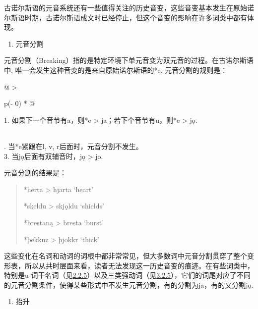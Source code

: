 古诺尔斯语的元音系统还有一些值得关注的历史音变，这些音变基本发生在原始诺尔斯语时期，古诺尔斯语成文时已经停止，但这个音变的影响在许多词类中都有体现。

\begin{enumerate}
  \def\labelenumi{\Alph{enumi}.}
  \setcounter{enumi}{3}
  \item
        元音分割
\end{enumerate}

元音分割（Breaking）指的是特定环境下单元音变为双元音的过程。在古诺尔斯语中,
唯一会发生这种音变的是来自原始诺尔斯语的*e. 元音分割的规则是：

\begin{longtable}[]{@{}
  >{\raggedright\arraybackslash}p{(\columnwidth - 0\tabcolsep) * }@{}}
  \toprule\noalign{}
  \begin{minipage}[b]{\linewidth}\raggedright
    1. 如果下一个音节有a，则*e \textgreater{} ja；若下个音节有u，则*e
    \textgreater{} jǫ.
  \end{minipage} \\
  \midrule\noalign{}
  \endhead
  \bottomrule\noalign{}
  . 当*e紧跟在l, v, r后面时，元音分割不发生。                     \\
  3. 当jǫ后面有双辅音时，jǫ \textgreater{} jo.                     \\
\end{longtable}

元音分割的结果是：

\begin{quote}
  *herta \textgreater{} hjarta `heart'

  *skeldu \textgreater{} skjǫldu `shields'

  *brestaną \textgreater{} bresta `burst'

  *þekkuz \textgreater{} þjokkr `thick'
\end{quote}

这些变化在名词和动词的词根中都非常常见，但大多数词中元音分割贯穿了整个变形表，所以从共时层面来看，读者无法发现这一历史音变的痕迹。在有些词类中，特别是u-词干名词（见\hyperref[u-ux8bcdux5e72]{2.2.5}）以及三类强动词（见\hyperref[ux7b2cux4e09ux5f3aux53d8ux4f4dux6cd5]{3.2.5}），它们的词尾对应了不同的元音分割条件，使得某些形式中不发生元音分割，有的分割为ja，有的又分割jǫ.

\begin{enumerate}
  \def\labelenumi{\Alph{enumi}.}
  \setcounter{enumi}{4}
  \item
        抬升
\end{enumerate}

